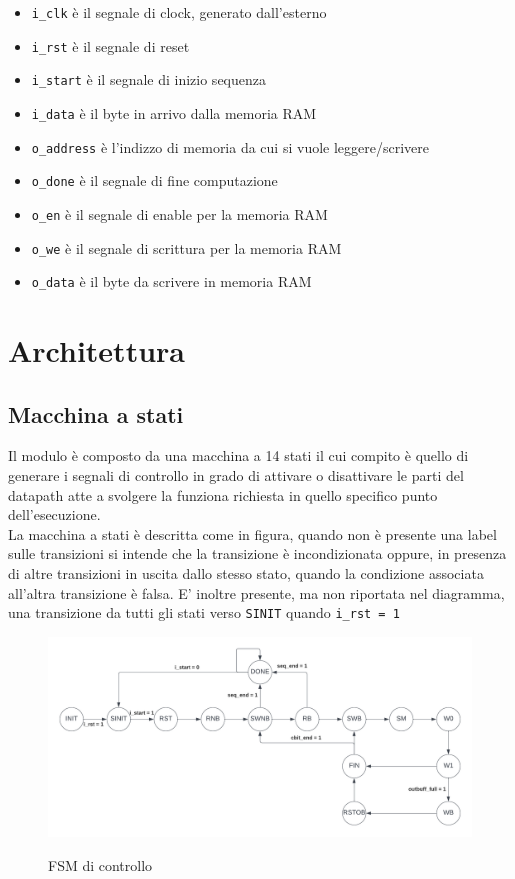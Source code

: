 \documentclass[12pt, a4paper]{article}
\begin{document}
\begin{itemize}
    \item \texttt{i\_clk} è il segnale di clock, generato dall'esterno
    \item \texttt{i\_rst} è il segnale di reset
    \item \texttt{i\_start} è il segnale di inizio sequenza
    \item \texttt{i\_data} è il byte in arrivo dalla memoria RAM
    \item \texttt{o\_address} è l'indizzo di memoria da cui si vuole leggere/scrivere
    \item \texttt{o\_done} è il segnale di fine computazione
    \item \texttt{o\_en} è il segnale di enable per la memoria RAM
    \item \texttt{o\_we} è il segnale di scrittura per la memoria RAM
    \item \texttt{o\_data} è il byte da scrivere in memoria RAM
\end{itemize}

\pagebreak

\section{Architettura}

\subsection{Macchina a stati}

Il modulo è composto da una macchina a 14 stati il cui compito è quello di generare
i segnali di controllo in grado di attivare o disattivare le parti del datapath atte a
svolgere la funziona richiesta in quello specifico punto dell'esecuzione.\\

La macchina a stati è descritta come in figura, quando non è presente una label sulle transizioni
si intende che la transizione è incondizionata oppure, in presenza di altre transizioni
in uscita dallo stesso stato, quando la condizione associata all'altra transizione è falsa.
E' inoltre presente, ma non riportata nel diagramma, una transizione da tutti gli stati 
verso \texttt{SINIT} quando \texttt{i\_rst = 1}

\begin{figure}[!h]
    \centering
    \includegraphics[scale=0.3]{fsm_controllo.png}
    \label{fig:ctrl_fsm}
    \caption{FSM di controllo}
    
\end{figure}
\end{document}
